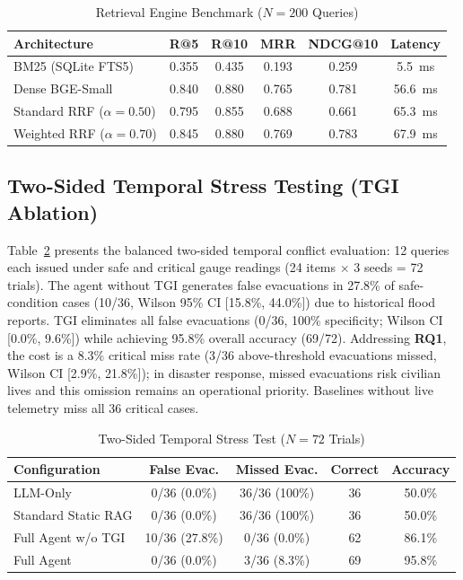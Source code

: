 \documentclass[conference]{IEEEtran}
\begin{document}
\begin{table}[ht]
\caption{Retrieval Engine Benchmark ($N=200$ Queries)}
\label{tab:retrieval}
\centering
\scriptsize
\setlength{\tabcolsep}{2pt}
\begin{tabular*}{\columnwidth}{@{\extracolsep{\fill}}lccccc@{}}
\toprule
Architecture & R@5 & R@10 & MRR & NDCG@10 & Latency \\
\midrule
BM25 (SQLite FTS5) & 0.355 & 0.435 & 0.193 & 0.259 & 5.5~ms \\
Dense BGE-Small & 0.840 & 0.880 & 0.765 & 0.781 & 56.6~ms \\
Standard RRF ($\alpha=0.50$) & 0.795 & 0.855 & 0.688 & 0.661 & 65.3~ms \\
\midrule
Weighted RRF ($\alpha=0.70$) & 0.845 & 0.880 & 0.769 & 0.783 & 67.9~ms \\
\bottomrule
\end{tabular*}
\end{table}

\subsection{Two-Sided Temporal Stress Testing (TGI Ablation)}
Table~\ref{tab:tgi} presents the balanced two-sided temporal conflict evaluation: 12 queries each issued under safe and critical gauge readings (24 items $\times$ 3 seeds = 72 trials). The agent without TGI generates false evacuations in 27.8\% of safe-condition cases (10/36, Wilson 95\% CI [15.8\%, 44.0\%]) due to historical flood reports. TGI eliminates all false evacuations (0/36, 100\% specificity; Wilson CI [0.0\%, 9.6\%]) while achieving 95.8\% overall accuracy (69/72). Addressing \textbf{RQ1}, the cost is a 8.3\% critical miss rate (3/36 above-threshold evacuations missed, Wilson CI [2.9\%, 21.8\%]); in disaster response, missed evacuations risk civilian lives and this omission remains an operational priority. Baselines without live telemetry miss all 36 critical cases.

\begin{table}[ht]
\caption{Two-Sided Temporal Stress Test ($N=72$ Trials)}
\label{tab:tgi}
\centering
\scriptsize
\setlength{\tabcolsep}{2pt}
\begin{tabular*}{\columnwidth}{@{\extracolsep{\fill}}lcccc@{}}
\toprule
Configuration & False Evac. & Missed Evac. & Correct & Accuracy \\
\midrule
LLM-Only & 0/36 (0.0\%) & 36/36 (100\%) & 36 & 50.0\% \\
Standard Static RAG & 0/36 (0.0\%) & 36/36 (100\%) & 36 & 50.0\% \\
Full Agent w/o TGI & 10/36 (27.8\%) & 0/36 (0.0\%) & 62 & 86.1\% \\
Full Agent & 0/36 (0.0\%) & 3/36 (8.3\%) & 69 & 95.8\% \\
\bottomrule
\end{tabular*}
\end{table}
\end{document}
